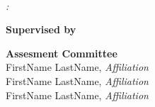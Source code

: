 \thispagestyle{empty}

\hfill

\vfill

\noindent
\myName\\
\textit{\myTitle:} \mySubtitle

\vspace{0.75em}
\noindent
\textbf{Supervised by}\\ 
\mySupervisor

\vspace{0.75em}
\noindent
\textbf{Assesment Committee}\\
FirstName LastName, \textit{Affiliation}\\
FirstName LastName, \textit{Affiliation}\\
FirstName LastName, \textit{Affiliation}